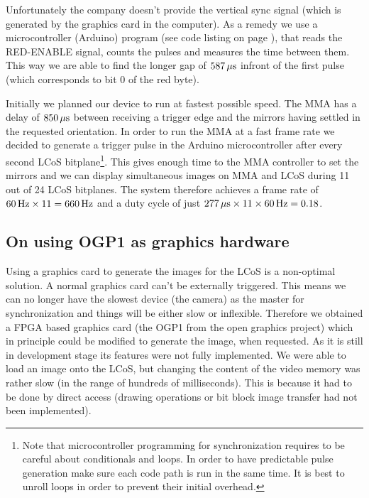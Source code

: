 Unfortunately the company doesn't provide the vertical sync signal
(which is generated by the graphics card in the computer). As a remedy
we use a microcontroller (Arduino) program (see code listing on page
\pageref{fig:arduino-vsync}), that reads the \textsf{RED-ENABLE} signal,
counts the pulses and measures the time between them. This way we are
able to find the longer gap of $\unit[587]{\mu s}$ infront of the
first pulse (which corresponds to bit 0 of the red byte).


Initially we planned our device to run at fastest possible speed. The
MMA has a delay of $\unit[850]{\mu s}$ between receiving a trigger
edge and the mirrors having settled in the requested orientation. In
order to run the MMA at a fast frame rate we decided to generate a
trigger pulse in the Arduino microcontroller after every second LCoS
bitplane\footnote{Note that microcontroller programming for
  synchronization requires to be careful about conditionals and
  loops. In order to have predictable pulse generation make sure each
  code path is run in the same time. It is best to unroll loops in
  order to prevent their initial overhead.}. This gives enough time to
the MMA controller to set the mirrors and we can display simultaneous
images on MMA and LCoS during 11 out of 24 LCoS bitplanes. The system
therefore achieves a frame rate of
$\unit[60]{Hz}\times11=\unit[660]{Hz}$ and a duty cycle of just
$\unit[277]{\mu s}\times11\times\unit[60]{Hz}=0.18$.

\subsection{On using OGP1 as graphics hardware}
Using a graphics card to generate the images for the LCoS is a
non-optimal solution. A normal graphics card can't be externally
triggered. This means we can no longer have the slowest device (the
camera) as the master for synchronization and things will be either
slow or inflexible. Therefore we obtained a FPGA based graphics card
(the OGP1 from the open graphics project) which in principle could be
modified to generate the image, when requested. As it is still in
development stage its features were not fully implemented. We were
able to load an image onto the LCoS, but changing the content of the
video memory was rather slow (in the range of hundreds of
milliseconds). This is because it had to be done by direct access
(drawing operations or bit block image transfer had not been
implemented).

